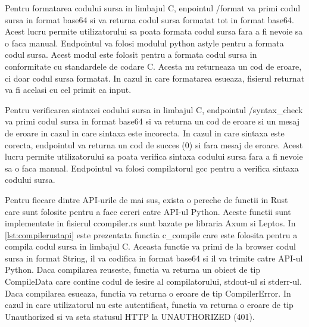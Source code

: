 \documentclass[titlepage,12pt]{article}
\DeclareRobustCommand{\code}[1]{{\ttfamily\small #1}}
\begin{document}
Pentru formatarea codului sursa in limbajul C, enpointul \code{/format} va primi codul sursa in format \code{base64} si va returna codul sursa formatat tot in format \code{base64}. Acest lucru permite utilizatorului sa poata formata codul sursa fara a fi nevoie sa o faca manual. Endpointul va folosi modulul python \code{astyle} pentru a formata codul sursa. Acest modul este folosit pentru a formata codul sursa in conformitate cu standardele de codare C. Acesta nu returneaza un cod de eroare, ci doar codul sursa formatat. In cazul in care formatarea esueaza, fisierul returnat va fi acelasi cu cel primit ca input.

Pentru verificarea sintaxei codului sursa in limbajul C, endpointul \code{/syntax\_check} va primi codul sursa in format \code{base64} si va returna un cod de eroare si un mesaj de eroare in cazul in care sintaxa este incorecta. In cazul in care sintaxa este corecta, endpointul va returna un cod de succes (0) si fara mesaj de eroare. Acest lucru permite utilizatorului sa poata verifica sintaxa codului sursa fara a fi nevoie sa o faca manual. Endpointul va folosi compilatorul \code{gcc} pentru a verifica sintaxa codului sursa.

Pentru fiecare dintre API-urile de mai sus, exista o pereche de functii in Rust care sunt folosite pentru a face cereri catre API-ul Python. Aceste functii sunt implementate in fisierul \code{ccompiler.rs} sunt bazate pe libraria \code{Axum} si \code{Leptos}. In \cref{lst:compilerustapi} este prezentata functia \code{c\_compile} care este folosita pentru a compila codul sursa in limbajul C. Aceasta functie va primi de la browser codul sursa in format \code{String}, il va codifica in format \code{base64} si il va trimite catre API-ul Python. Daca compilarea reuseste, functia va returna un obiect de tip \code{CompileData} care contine codul de iesire al compilatorului, stdout-ul si stderr-ul. Daca compilarea esueaza, functia va returna o eroare de tip \code{CompilerError}. In cazul in care utilizatorul nu este autentificat, functia va returna o eroare de tip \code{Unauthorized} si va seta statusul HTTP la \code{UNAUTHORIZED (401)}.
\end{document}
